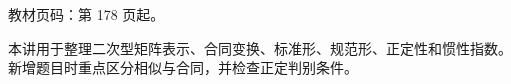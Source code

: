 
\begin{knowledgeBox}
教材页码：第 178 页起。

本讲用于整理二次型矩阵表示、合同变换、标准形、规范形、正定性和惯性指数。新增题目时重点区分相似与合同，并检查正定判别条件。
\end{knowledgeBox}
